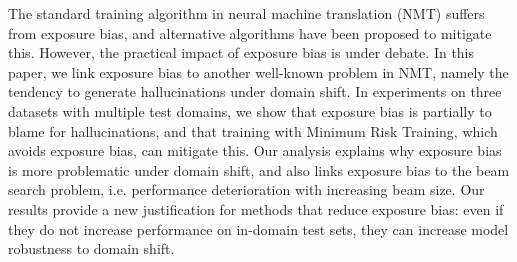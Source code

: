 The standard training algorithm in neural machine translation (NMT) suffers from exposure bias, and alternative algorithms have been proposed to mitigate this. However, the practical impact of exposure bias is under debate. In this paper, we link exposure bias to another well-known problem in NMT, namely the tendency to generate hallucinations under domain shift. In experiments on three datasets with multiple test domains, we show that exposure bias is partially to blame for hallucinations, and that training with Minimum Risk Training, which avoids exposure bias, can mitigate this. Our analysis explains why exposure bias is more problematic under domain shift, and also links exposure bias to the beam search problem, i.e. performance deterioration with increasing beam size. Our results provide a new justification for methods that reduce exposure bias: even if they do not increase performance on in-domain test sets, they can increase model robustness to domain shift.
